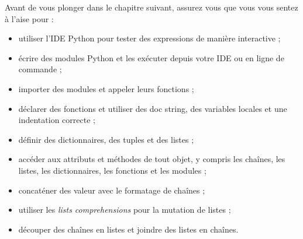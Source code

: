 Avant de vous plonger dans le chapitre suivant, assurez vous que vous vous
sentez à l'aise pour :
\begin{itemize}
\item{utiliser l'IDE Python pour tester des expressions de manière interactive ;}
\item{écrire des modules Python et les exécuter depuis votre IDE ou en ligne de commande ;}
\item{importer des modules et appeler leurs fonctions ;}
\item{déclarer des fonctions et utiliser des doc string, des variables locales et une indentation correcte ;}
\item{définir des dictionnaires, des tuples et des listes ;}
\item{accéder aux attributs et méthodes de tout objet, y compris les chaînes, les listes, les dictionnaires, les fonctions et les modules ;}
\item{concaténer des valeur avec le formatage de chaînes ;}
\item{utiliser les \emph{lists comprehensions} pour la mutation de listes ;}
\item{découper des chaînes en listes et joindre des listes en chaînes.}
\end{itemize}
